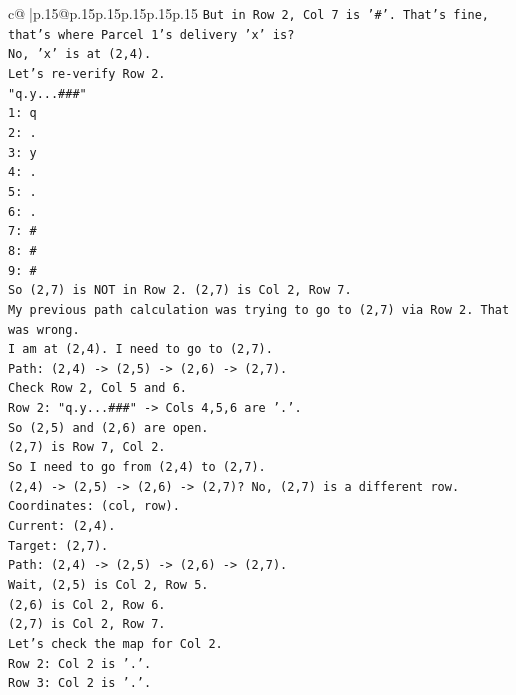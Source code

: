 \documentclass{article}
\begin{document}
{\begin{supertabular}{c@{$\;$}|p{.15\linewidth}@{}p{.15\linewidth}p{.15\linewidth}p{.15\linewidth}p{.15\linewidth}p{.15\linewidth}}
{{{\texttt{But in Row 2, Col 7 is '\#'. That's fine, that's where Parcel 1's delivery 'x' is?} \\
\texttt{No, 'x' is at (2,4).} \\
\texttt{Let's re{-}verify Row 2.} \\
\texttt{"q.y...\#\#\#"} \\
\texttt{1: q} \\
\texttt{2: .} \\
\texttt{3: y} \\
\texttt{4: .} \\
\texttt{5: .} \\
\texttt{6: .} \\
\texttt{7: \#} \\
\texttt{8: \#} \\
\texttt{9: \#} \\
\texttt{So (2,7) is NOT in Row 2. (2,7) is Col 2, Row 7.} \\
\texttt{My previous path calculation was trying to go to (2,7) via Row 2. That was wrong.} \\
\texttt{I am at (2,4). I need to go to (2,7).} \\
\texttt{Path: (2,4) {-}> (2,5) {-}> (2,6) {-}> (2,7).} \\
\texttt{Check Row 2, Col 5 and 6.} \\
\texttt{Row 2: "q.y...\#\#\#" {-}> Cols 4,5,6 are '.'.} \\
\texttt{So (2,5) and (2,6) are open.} \\
\texttt{(2,7) is Row 7, Col 2.} \\
\texttt{So I need to go from (2,4) to (2,7).} \\
\texttt{(2,4) {-}> (2,5) {-}> (2,6) {-}> (2,7)? No, (2,7) is a different row.} \\
\texttt{Coordinates: (col, row).} \\
\texttt{Current: (2,4).} \\
\texttt{Target: (2,7).} \\
\texttt{Path: (2,4) {-}> (2,5) {-}> (2,6) {-}> (2,7).} \\
\texttt{Wait, (2,5) is Col 2, Row 5.} \\
\texttt{(2,6) is Col 2, Row 6.} \\
\texttt{(2,7) is Col 2, Row 7.} \\
\texttt{Let's check the map for Col 2.} \\
\texttt{Row 2: Col 2 is '.'.} \\
\texttt{Row 3: Col 2 is '.'.} \\
}}}
\end{supertabular}}
\end{document}
